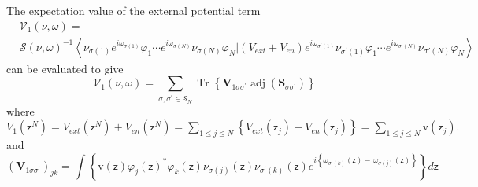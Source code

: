 \documentclass[aps,preprint]{revtex4}%
\begin{document}
The expectation value of the external potential term
\begin{align}
&  \mathcal{V}_{1}\left(  \nu,\omega\right)  =\nonumber\\
&  \mathcal{S}\left(  \nu,\omega\right)  ^{-1}\left\langle \nu_{\sigma\left(
1\right)  }e^{i\omega_{\sigma\left(  1\right)  }}\varphi_{1}\cdots
e^{i\omega_{\sigma\left(  N\right)  }}\nu_{\sigma\left(  N\right)  }%
\varphi_{N}\left\vert \left(  V_{ext}+V_{en}\right)  \right.  e^{i\omega
_{\sigma^{\prime}\left(  1\right)  }}\nu_{\sigma^{\prime}\left(  1\right)
}\varphi_{1}\cdots e^{i\omega_{\sigma^{\prime}\left(  N\right)  }}\nu
_{\sigma\prime\left(  N\right)  }\varphi_{N}\right\rangle
\end{align}
can be evaluated to give
\begin{equation}
\mathcal{V}_{1}\left(  \nu,\omega\right)  =%
{\textstyle\sum\limits_{\sigma,\sigma^{\prime}\in\mathcal{S}_{N}}}
\operatorname{Tr}\left\{  \mathbf{V}_{1\sigma\sigma^{\prime}}%
\operatorname{adj}\left(  \mathbf{S}_{\sigma\sigma^{\prime}}\right)  \right\}
\end{equation}
where $V_{1}\left(  \mathsf{z}^{N}\right)  =V_{ext}\left(  \mathsf{z}%
^{N}\right)  +V_{en}\left(  \mathsf{z}^{N}\right)  =%
{\displaystyle\sum\limits_{1\leq j\leq N}}
\left\{  V_{ext}\left(  \mathsf{z}_{j}\right)  +V_{en}\left(  \mathsf{z}%
_{j}\right)  \right\}  =%
{\displaystyle\sum\limits_{1\leq j\leq N}}
\mathrm{v}\left(  \mathsf{z}_{j}\right)  .$and
\begin{equation}
\left(  \mathbf{V}_{1\sigma\sigma^{\prime}}\right)  _{jk}=\int\left\{
\mathrm{v}\left(  \mathsf{z}\right)  \varphi_{j}\left(  \mathsf{z}\right)
^{\ast}\varphi_{k}\left(  \mathsf{z}\right)  \nu_{\sigma\left(  j\right)
}\left(  \mathsf{z}\right)  \nu_{\sigma^{\prime}\left(  k\right)  }\left(
\mathsf{z}\right)  e^{i\left\{  \omega_{\sigma^{\prime}\left(  k\right)
}\left(  \mathsf{z}\right)  -\,\omega_{\sigma\left(  j\right)  }\left(
\mathsf{z}\right)  \right\}  }\right\}  d\mathsf{z}%
\end{equation}
\end{document}
